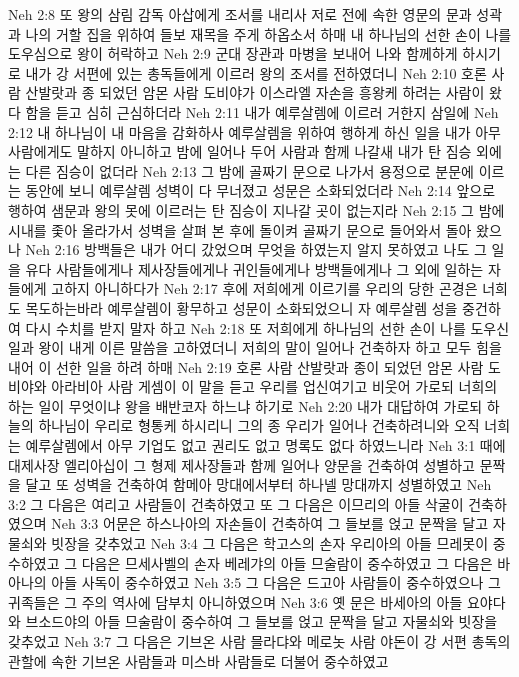 Neh 2:8  또 왕의 삼림 감독 아삽에게 조서를 내리사 저로 전에 속한 영문의 문과 성곽과 나의 거할 집을 위하여 들보 재목을 주게 하옵소서 하매 내 하나님의 선한 손이 나를 도우심으로 왕이 허락하고
Neh 2:9  군대 장관과 마병을 보내어 나와 함께하게 하시기로 내가 강 서편에 있는 총독들에게 이르러 왕의 조서를 전하였더니
Neh 2:10  호론 사람 산발랏과 종 되었던 암몬 사람 도비야가 이스라엘 자손을 흥왕케 하려는 사람이 왔다 함을 듣고 심히 근심하더라
Neh 2:11  내가 예루살렘에 이르러 거한지 삼일에
Neh 2:12  내 하나님이 내 마음을 감화하사 예루살렘을 위하여 행하게 하신 일을 내가 아무 사람에게도 말하지 아니하고 밤에 일어나 두어 사람과 함께 나갈새 내가 탄 짐승 외에는 다른 짐승이 없더라
Neh 2:13  그 밤에 골짜기 문으로 나가서 용정으로 분문에 이르는 동안에 보니 예루살렘 성벽이 다 무너졌고 성문은 소화되었더라
Neh 2:14  앞으로 행하여 샘문과 왕의 못에 이르러는 탄 짐승이 지나갈 곳이 없는지라
Neh 2:15  그 밤에 시내를 좇아 올라가서 성벽을 살펴 본 후에 돌이켜 골짜기 문으로 들어와서 돌아 왔으나
Neh 2:16  방백들은 내가 어디 갔었으며 무엇을 하였는지 알지 못하였고 나도 그 일을 유다 사람들에게나 제사장들에게나 귀인들에게나 방백들에게나 그 외에 일하는 자들에게 고하지 아니하다가
Neh 2:17  후에 저희에게 이르기를 우리의 당한 곤경은 너희도 목도하는바라 예루살렘이 황무하고 성문이 소화되었으니 자 예루살렘 성을 중건하여 다시 수치를 받지 말자 하고
Neh 2:18  또 저희에게 하나님의 선한 손이 나를 도우신 일과 왕이 내게 이른 말씀을 고하였더니 저희의 말이 일어나 건축하자 하고 모두 힘을 내어 이 선한 일을 하려 하매
Neh 2:19  호론 사람 산발랏과 종이 되었던 암몬 사람 도비야와 아라비아 사람 게셈이 이 말을 듣고 우리를 업신여기고 비웃어 가로되 너희의 하는 일이 무엇이냐 왕을 배반코자 하느냐 하기로
Neh 2:20  내가 대답하여 가로되 하늘의 하나님이 우리로 형통케 하시리니 그의 종 우리가 일어나 건축하려니와 오직 너희는 예루살렘에서 아무 기업도 없고 권리도 없고 명록도 없다 하였느니라
Neh 3:1  때에 대제사장 엘리아십이 그 형제 제사장들과 함께 일어나 양문을 건축하여 성별하고 문짝을 달고 또 성벽을 건축하여 함메아 망대에서부터 하나넬 망대까지 성별하였고
Neh 3:2  그 다음은 여리고 사람들이 건축하였고 또 그 다음은 이므리의 아들 삭굴이 건축하였으며
Neh 3:3  어문은 하스나아의 자손들이 건축하여 그 들보를 얹고 문짝을 달고 자물쇠와 빗장을 갖추었고
Neh 3:4  그 다음은 학고스의 손자 우리아의 아들 므레못이 중수하였고 그 다음은 므세사벨의 손자 베레갸의 아들 므술람이 중수하였고 그 다음은 바아나의 아들 사독이 중수하였고
Neh 3:5  그 다음은 드고아 사람들이 중수하였으나 그 귀족들은 그 주의 역사에 담부치 아니하였으며
Neh 3:6  옛 문은 바세아의 아들 요야다와 브소드야의 아들 므술람이 중수하여 그 들보를 얹고 문짝을 달고 자물쇠와 빗장을 갖추었고
Neh 3:7  그 다음은 기브온 사람 믈라댜와 메로놋 사람 야돈이 강 서편 총독의 관할에 속한 기브온 사람들과 미스바 사람들로 더불어 중수하였고

